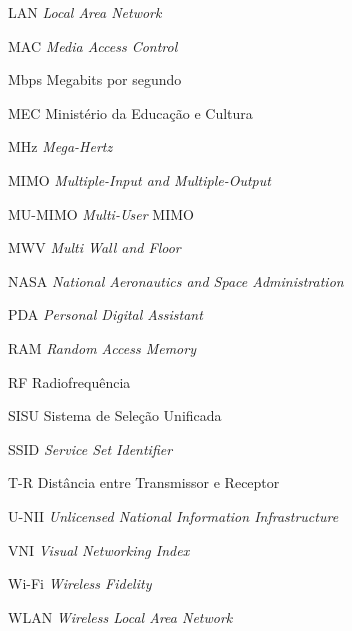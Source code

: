 \begin{siglas}
	\item[LAN] \hspace{.8cm} \textit{Local Area Network}
	\item[MAC] \hspace{.8cm} \textit{Media Access Control}
	\item[Mbps] \hspace{.8cm} Megabits por segundo
	\item[MEC] \hspace{.8cm} Ministério da Educação e Cultura
	\item[MHz] \hspace{.8cm} \textit{Mega-Hertz}
	\item[MIMO] \hspace{.8cm} \textit{Multiple-Input and Multiple-Output}
	\item[MU-MIMO] \hspace{.8cm} \textit{Multi-User} MIMO
	\item[MWV] \hspace{.8cm} \textit{Multi Wall and Floor}
	\item[NASA] \hspace{.8cm} \textit{National Aeronautics and Space Administration}
	\item[PDA] \hspace{.8cm} \textit{Personal Digital Assistant}
	\item[RAM] \hspace{.8cm} \textit{Random Access Memory}
	\item[RF] \hspace{.8cm} Radiofrequência
	\item[SISU] \hspace{.8cm} Sistema de Seleção Unificada
	\item[SSID] \hspace{.8cm} \textit{Service Set Identifier}
	\item[T-R] \hspace{.8cm} Distância entre Transmissor e Receptor
	\item[U-NII] \hspace{.8cm} \textit{Unlicensed National Information Infrastructure}
	\item[VNI] \hspace{.8cm} \textit{Visual Networking Index}
	\item[Wi-Fi] \hspace{.8cm} \textit{Wireless Fidelity}
	\item[WLAN] \hspace{.8cm} \textit{Wireless Local Area Network}
\end{siglas}